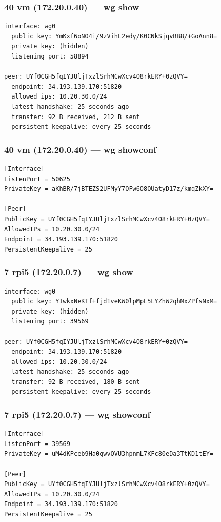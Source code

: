 \documentclass[11pt,a4paper]{article}
\begin{document}
\subsubsection*{40 vm (172.20.0.40) — wg show}
\begin{lstlisting}
interface: wg0
  public key: YmKxf6oNO4i/9zVihL2edy/K0CNkSjqvBB8/+GoAnn8=
  private key: (hidden)
  listening port: 58894

peer: UYf0CGH5fqIYJUljTxzlSrhMCwXcv4O8rkERY+0zQVY=
  endpoint: 34.193.139.170:51820
  allowed ips: 10.20.30.0/24
  latest handshake: 25 seconds ago
  transfer: 92 B received, 212 B sent
  persistent keepalive: every 25 seconds

\end{lstlisting}

\subsubsection*{40 vm (172.20.0.40) — wg showconf}
\begin{lstlisting}
[Interface]
ListenPort = 50625
PrivateKey = aKhBR/7jBTEZS2UFMyY7OFw6O8OUatyD17z/kmqZkXY=

[Peer]
PublicKey = UYf0CGH5fqIYJUljTxzlSrhMCwXcv4O8rkERY+0zQVY=
AllowedIPs = 10.20.30.0/24
Endpoint = 34.193.139.170:51820
PersistentKeepalive = 25

\end{lstlisting}

\subsubsection*{7 rpi5 (172.20.0.7) — wg show}
\begin{lstlisting}
interface: wg0
  public key: YIwkxNeKTf+fjd1veKW0lpMpL5LYZhW2qhMxZPfsNxM=
  private key: (hidden)
  listening port: 39569

peer: UYf0CGH5fqIYJUljTxzlSrhMCwXcv4O8rkERY+0zQVY=
  endpoint: 34.193.139.170:51820
  allowed ips: 10.20.30.0/24
  latest handshake: 25 seconds ago
  transfer: 92 B received, 180 B sent
  persistent keepalive: every 25 seconds

\end{lstlisting}

\subsubsection*{7 rpi5 (172.20.0.7) — wg showconf}
\begin{lstlisting}
[Interface]
ListenPort = 39569
PrivateKey = uM4dKPceb9Ha0qwvQVU3hpnmL7KFc80eDa3TtKD1tEY=

[Peer]
PublicKey = UYf0CGH5fqIYJUljTxzlSrhMCwXcv4O8rkERY+0zQVY=
AllowedIPs = 10.20.30.0/24
Endpoint = 34.193.139.170:51820
PersistentKeepalive = 25

\end{lstlisting}
\end{document}
